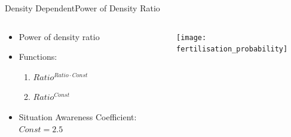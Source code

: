 \documentclass{beamer}
\begin{document}
\begin{frame}{Density Dependent}{Power of Density Ratio}
    \begin{columns}
        \begin{column}{0.4\textwidth}
            \begin{itemize}
                \item Power of density ratio
                \item Functions:
                    \begin{enumerate}
                        \item $ Ratio^{Ratio \cdot Const} $
                        \item \sout{$Ratio^{Const}$}
                    \end{enumerate}
                \item Situation Awareness Coefficient: $Const = 2.5$
            \end{itemize}
        \end{column}
        \begin{column}{0.6\textwidth}
            \texttt{[image: fertilisation\_probability]}
        \end{column}
    \end{columns}
\end{frame}
\end{document}
